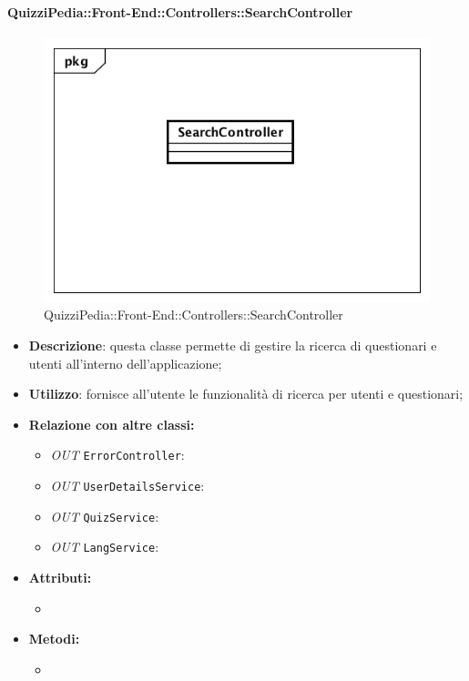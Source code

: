 \paragraph{QuizziPedia::Front-End::Controllers::SearchController}
\begin{figure}
	\centering
	\includegraphics[scale=0.45]{UML/Classi/Front-End/QuizziPedia_Front-end_Controller_SearchController.png}
	\caption{QuizziPedia::Front-End::Controllers::SearchController}
\end{figure}
\begin{itemize}
	\item \textbf{Descrizione}: questa classe permette di gestire la ricerca di questionari e utenti all'interno dell'applicazione;
	\item \textbf{Utilizzo}: fornisce all'utente le funzionalità di ricerca per utenti e questionari;
	\item \textbf{Relazione con altre classi:}
	\begin{itemize}
		\item \textit{OUT} \texttt{ErrorController}: 
		\item \textit{OUT} \texttt{UserDetailsService}: 
		\item \textit{OUT} \texttt{QuizService}: 
		\item \textit{OUT} \texttt{LangService}: 
	\end{itemize}
	\item \textbf{Attributi:}
	\begin{itemize}
		\item 
	\end{itemize}
	\item \textbf{Metodi:}
	\begin{itemize}
		\item 
	\end{itemize}
\end{itemize}

